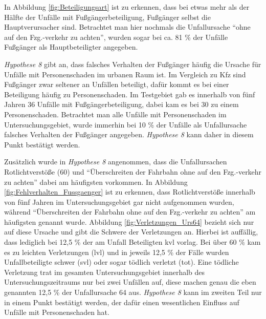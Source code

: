 In Abbildung \ref{fig:Beteiligungsart} ist zu erkennen, dass bei etwas mehr als der Hälfte der Unfälle mit Fußgängerbeteiligung, Fußgänger selbst die Hauptverursacher sind. Betrachtet man hier nochmals die Unfallursache \enquote{ohne auf den Fzg.-verkehr zu achten}, wurden sogar bei ca. 81 \% der Unfälle Fußgänger als Hauptbeteiligter angegeben.

\textit{Hypothese 8} gibt an, dass falsches Verhalten der Fußgänger häufig die Ursache für Unfälle mit Personenschaden im urbanen Raum ist. Im Vergleich zu Kfz sind Fußgänger zwar seltener an Unfällen beteiligt, dafür kommt es bei einer Beteiligung häufig zu Personenschaden. Im Testgebiet gab es innerhalb von fünf Jahren 36 Unfälle mit Fußgängerbeteiligung, dabei kam es bei 30 zu einem Personenschaden. Betrachtet man alle Unfälle mit Personenschaden im Untersuchungsgebiet, wurde immerhin bei 10 \% der Unfälle als Unfallursache falsches Verhalten der Fußgänger angegeben. \textit{Hypothese 8} kann daher in diesem Punkt bestätigt werden.

Zusätzlich wurde in \textit{Hypothese 8} angenommen, dass die Unfallursachen Rotlichtverstöße (60) und \enquote{Überschreiten der Fahrbahn ohne auf den Fzg.-verkehr zu achten} dabei am häufigsten vorkommen. In Abbildung \ref{fig:Fehlverhalten_Fussgaenger} ist zu erkennen, dass Rotlichtverstöße innerhalb von fünf Jahren im Untersuchungsgebiet gar nicht aufgenommen wurden, während \enquote{Überschreiten der Fahrbahn ohne auf den Fzg.-verkehr zu achten} am häufigsten genannt wurde. Abbildung \ref{fig:Verletzungen_Urs64} bezieht sich nur auf diese Ursache und gibt die Schwere der Verletzungen an. Hierbei ist auffällig, dass lediglich bei 12,5 \% der am Unfall Beteiligten \ac{kvl} vorlag. Bei über 60 \% kam es zu leichten Verletzungen (lvl) und in jeweils 12,5 \% der Fälle wurden Unfallbeteiligte schwer (svl) oder sogar tödlich verletzt (tot). Eine tödliche Verletzung trat im gesamten Untersuchungsgebiet innerhalb des Untersuchungszeitraums nur bei zwei Unfällen auf, diese machen genau die eben genannten 12,5 \% der Unfallursache 64 aus. \textit{Hypothese 8} kann im zweiten Teil nur in einem Punkt bestätigt werden, der dafür einen wesentlichen Einfluss auf Unfälle mit Personenschaden hat.

